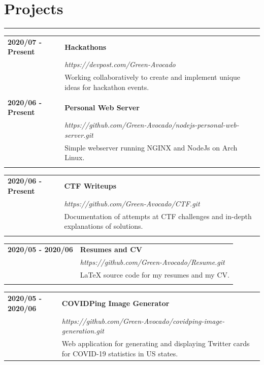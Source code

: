 \documentclass[letterpaper]{article}
\newcommand{\horizontalLine}{%
    \rule{\textwidth}{0.2pt}
    \vspace{1ex}
}
\begin{document}
    \section*{Projects}

        \horizontalLine

        \begin{tabular}{p{} p{}} 
            \textbf{2020/07 - Present} & \large\textbf{Hackathons} \\
            & \emph{https://devpost.com/Green-Avocado} \\
            & Working collaboratively to create and implement unique ideas for hackathon events. \\
            \\
            \textbf{2020/06 - Present} & \large\textbf{Personal Web Server} \\
            & \emph{https://github.com/Green-Avocado/nodejs-personal-web-server.git} \\
            & Simple webserver running NGINX and NodeJs on Arch Linux. \\
            \\
        \end{tabular}

        \begin{tabular}{p{} p{}} 
            \textbf{2020/06 - Present} & \large\textbf{CTF Writeups} \\
            & \emph{https://github.com/Green-Avocado/CTF.git} \\
            & Documentation of attempts at CTF challenges and in-depth explanations of solutions. \\
            \\
        \end{tabular}

        \begin{tabular}{p{} p{}} 
            \textbf{2020/05 - 2020/06} & \large\textbf{Resumes and CV} \\
            & \emph{https://github.com/Green-Avocado/Resume.git} \\
            & LaTeX source code for my resumes and my CV. \\
            \\
        \end{tabular}

        \begin{tabular}{p{} p{}} 
            \textbf{2020/05 - 2020/06} & \large\textbf{COVIDPing Image Generator} \\
            & \emph{https://github.com/Green-Avocado/covidping-image-generation.git} \\
            & Web application for generating and displaying Twitter cards for COVID-19 statistics in US states. \\
        \end{tabular}
\end{document}
